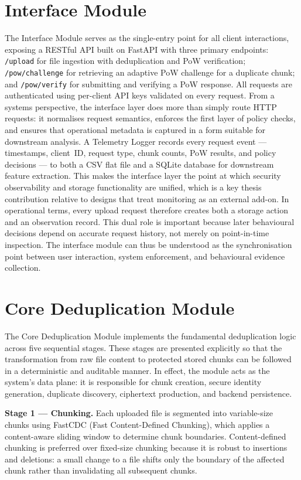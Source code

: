 \documentclass[12pt,a4paper,oneside]{report}
\begin{document}
\section{Interface Module}

The Interface Module serves as the single-entry point for all client interactions, exposing a RESTful API built on FastAPI with three primary endpoints:
\texttt{/upload} for file ingestion with deduplication and PoW verification;
\texttt{/pow/challenge} for retrieving an adaptive PoW challenge for a duplicate chunk;
and \texttt{/pow/verify} for submitting and verifying a PoW response.
All requests are authenticated using per-client API keys validated on every request.
From a systems perspective, the interface layer does more than simply route HTTP requests: it normalises request semantics, enforces the first layer of policy checks, and ensures that operational metadata is captured in a form suitable for downstream analysis.
A Telemetry Logger records every request event --- timestamps, client~ID, request type, chunk counts, PoW results, and policy decisions --- to both a CSV flat file and a SQLite database for downstream feature extraction.
This makes the interface layer the point at which security observability and storage functionality are unified, which is a key thesis contribution relative to designs that treat monitoring as an external add-on.
In operational terms, every upload request therefore creates both a storage action and an observation record.
This dual role is important because later behavioural decisions depend on accurate request history, not merely on point-in-time inspection.
The interface module can thus be understood as the synchronisation point between user interaction, system enforcement, and behavioural evidence collection.

\section{Core Deduplication Module}

The Core Deduplication Module implements the fundamental deduplication logic across five sequential stages.
These stages are presented explicitly so that the transformation from raw file content to protected stored chunks can be followed in a deterministic and auditable manner.
In effect, the module acts as the system's data plane: it is responsible for chunk creation, secure identity generation, duplicate discovery, ciphertext production, and backend persistence.

\textbf{Stage 1 — Chunking.}
Each uploaded file is segmented into variable-size chunks using FastCDC (Fast Content-Defined Chunking), which applies a content-aware sliding window to determine chunk boundaries.
Content-defined chunking is preferred over fixed-size chunking because it is robust to insertions and deletions: a small change to a file shifts only the boundary of the affected chunk rather than invalidating all subsequent chunks.
\end{document}
